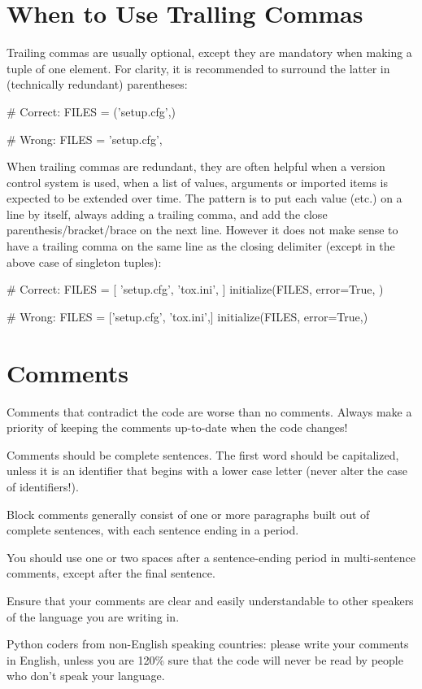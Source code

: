 \documentclass[a4paper,11pt]{article}
\begin{document}
\section{When to Use Tralling Commas}
Trailing commas are usually optional, except they are mandatory when making a 
tuple of one element. For clarity, it is recommended to surround the latter 
in (technically redundant) parentheses:
\par
\begin{python}
# Correct:
FILES = ('setup.cfg',)
\end{python}
\begin{python}
# Wrong:
FILES = 'setup.cfg',
\end{python}
When trailing commas are redundant, they are often helpful when a version 
control system is used, when a list of values, arguments or imported items is 
expected to be extended over time. The pattern is to put each value (etc.) on 
a line by itself, always adding a trailing comma, and add the close 
parenthesis/bracket/brace on the next line. However it does not make sense to 
have a trailing comma on the same line as the closing delimiter (except in 
the above case of singleton tuples):
\par
\begin{python}
# Correct:
FILES = [
    'setup.cfg',
    'tox.ini',
    ]
initialize(FILES,
           error=True,
           )
\end{python}
\begin{python}
# Wrong:
FILES = ['setup.cfg', 'tox.ini',]
initialize(FILES, error=True,)
\end{python}
\section{Comments}
Comments that contradict the code are worse than no comments. Always make a 
priority of keeping the comments up-to-date when the code changes!
\par
Comments should be complete sentences. The first word should be capitalized, 
unless it is an identifier that begins with a lower case letter (never alter 
the case of identifiers!).
\par
Block comments generally consist of one or more paragraphs built out of 
complete sentences, with each sentence ending in a period.
\par
You should use one or two spaces after a sentence-ending period in 
multi-sentence comments, except after the final sentence.
\par
Ensure that your comments are clear and easily understandable to other 
speakers of the language you are writing in.
\par
Python coders from non-English speaking countries: please write your comments 
in English, unless you are 120\% sure that the code will never be read by 
people who don’t speak your language.
\end{document}
